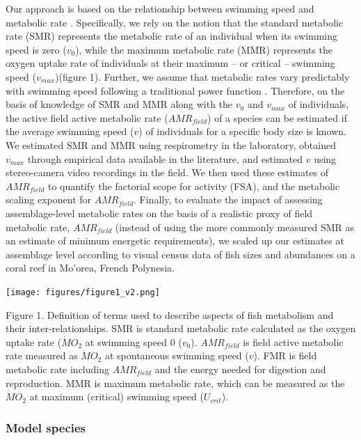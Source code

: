 \documentclass[
]{article}
\begin{document}
Our approach is based on the relationship between swimming speed and
metabolic rate \citep{Binning2013, Norin2016, Torres1983}. Specifically,
we rely on the notion that the standard metabolic rate (SMR) represents
the metabolic rate of an individual when its swimming speed is zero
(\(v_0\)), while the maximum metabolic rate (MMR) represents the oxygen
uptake rate of individuals at their maximum -- or critical -- swimming
speed (\(v_{max}\))(figure 1). Further, we assume that metabolic rates
vary predictably with swimming speed following a traditional power
function \citep{Brett1964, Korsmeyer2002}. Therefore, on the basis of
knowledge of SMR and MMR along with the \(v_0\) and \(v_{max}\) of
individuals, the active field active metabolic rate (\(AMR_{field}\)) of
a species can be estimated if the average swimming speed (\(v\)) of
individuals for a specific body size is known. We estimated SMR and MMR
using respirometry in the laboratory, obtained \(v_{max}\) through
empirical data available in the literature, and estimated \(v\) using
stereo-camera video recordings in the field. We then used these
estimates of \(AMR_{field}\) to quantify the factorial scope for
activity (FSA), and the metabolic scaling exponent for \(AMR_{field}\).
Finally, to evaluate the impact of assessing assemblage-level metabolic
rates on the basis of a realistic proxy of field metabolic rate,
\(AMR_{field}\) (instead of using the more commonly measured SMR as an
estimate of minimum energetic requirements), we scaled up our estimates
at assemblage level according to visual census data of fish sizes and
abundances on a coral reef in Mo'orea, French Polynesia.

\texttt{[image: figures/figure1\_v2.png]}

Figure 1. Definition of terms used to describe aspects of fish
metabolism and their inter-relationships. SMR is standard metabolic rate
calculated as the oxygen uptake rate (\(\dot{M}O_{2}\) at swimming speed
0 (\(v_0\)). \(AMR_{field}\) is field active metabolic rate measured as
\(\dot{M}O_{2}\) at spontaneous swimming speed (\(v\)). FMR is field
metabolic rate including \(AMR_{field}\) and the energy needed for
digestion and reproduction. MMR is maximum metabolic rate, which can be
measured as the \(\dot{M}O_{2}\) at maximum (critical) swimming speed
(\(U_{crit}\)).

\hypertarget{model-species}{%
\subsubsection{Model species}\label{model-species}}
\end{document}
